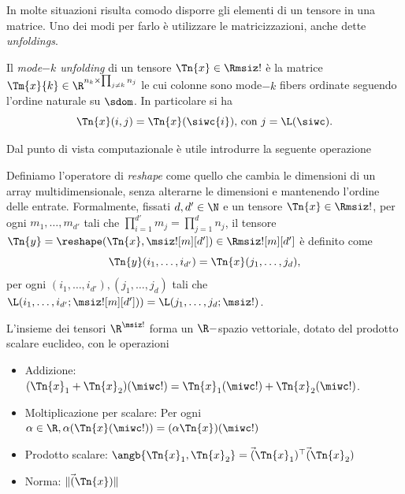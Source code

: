 In molte situazioni risulta comodo disporre gli elementi di un tensore in una matrice. Uno dei modi
per farlo è utilizzare le matricizzazioni, anche dette \emph{unfoldings}.

\begin{definition}
  Il \emph{mode$-k$ unfolding} di un tensore $ \Tn{x} \in \Rmsiz! $ è la matrice $ \Tm{x}{k} \in \R^{n_k \times
  \prod_{j\neq k}n_j} $ le cui colonne sono mode$ -k $ fibers ordinate seguendo l'ordine naturale
  su $ \sdom $. In particolare si ha
  \[
  \Tn{x}(i,j) = \Tn{x}(\siwc{i}) \text{, con } j = \L(\siwc)
  .\] 
\end{definition}

Dal punto di vista computazionale è utile introdurre la seguente operazione

\begin{definition}[Reshape]
  Definiamo l'operatore di \emph{reshape} come quello che cambia le dimensioni di un array
  multidimensionale, senza alterarne le dimensioni e mantenendo l'ordine delle entrate. Formalmente,
  fissati $ d, d' \in \N$ e un tensore $ \Tn{x} \in \Rmsiz! $, per ogni $ m_1, \ldots, m_{d'} $ tali
  che $ \prod_{i=1}^{d'} m_j = \prod_{j = 1}^{d} n_j$, il tensore $ \Tn{y} = \reshape(\Tn{x},
  \msiz![m][d']) \in \Rmsiz![m][d'] $ è definito come
  \[
  \Tn{y}(i_1, \ldots, i_{d'})= \Tn{x}(j_1, \ldots, j_d) 
,\] 
 per ogni $(i_1, \ldots, i_{d'}),(j_1, \ldots,
  j_d) $ tali che $ \L(i_1, \ldots, i_{d'}; \msiz![m][d'])) = \L(j_1, \ldots,
  j_d; \msiz!)$.
\end{definition}

\begin{remark}
  L'insieme dei tensori $ \R^{\msiz!} $ forma un $ \R- $spazio vettoriale, dotato del prodotto
  scalare euclideo, con le operazioni
  \begin{itemize}
    \item Addizione: $(\Tn{x}_1 + \Tn{x}_2)(\miwc!) = \Tn{x}_1(\miwc!) + \Tn{x}_2(\miwc!)$.
    \item Moltiplicazione per scalare: Per ogni $ \alpha \in \R, \alpha (\Tn{x}(\miwc!)) = (\alpha
      \Tn{x})(\miwc!)$
    \item Prodotto scalare: $ \angb{\Tn{x}_1, \Tn{x}_2} = \vec(\Tn{x}_1)^{\top} \vec(\Tn{x}_2)$
    \item Norma: $\| \vec(\Tn{x})\|$
  \end{itemize}
\end{remark}

